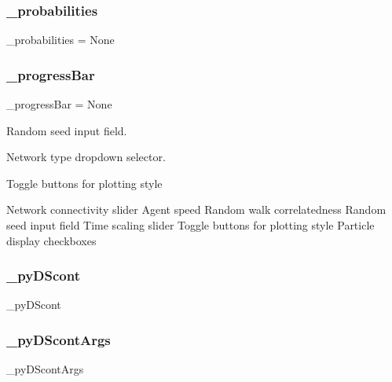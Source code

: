 \subsubsection{\texorpdfstring{\+\_\+probabilities}{\_probabilities}}
{\footnotesize\ttfamily \+\_\+probabilities = None\hspace{0.3cm}{\ttfamily [private]}}

\mbox{\label{namespace_mu_mo_t_a018864aa22d2adb0d3958fb0adbce8e2}} 
\subsubsection{\texorpdfstring{\+\_\+progress\+Bar}{\_progressBar}}
{\footnotesize\ttfamily \+\_\+progress\+Bar = None\hspace{0.3cm}{\ttfamily [private]}}



Random seed input field. 

Network type dropdown selector.

Toggle buttons for plotting style

Network connectivity slider Agent speed Random walk correlatedness Random seed input field Time scaling slider Toggle buttons for plotting style Particle display checkboxes \mbox{\label{namespace_mu_mo_t_a797e92fe19ce2636a49bf1400a69fc49}} 
\subsubsection{\texorpdfstring{\+\_\+py\+D\+Scont}{\_pyDScont}}
{\footnotesize\ttfamily \+\_\+py\+D\+Scont\hspace{0.3cm}{\ttfamily [private]}}

\mbox{\label{namespace_mu_mo_t_aa56e2cffc879be68fdec55f29334415c}} 
\subsubsection{\texorpdfstring{\+\_\+py\+D\+Scont\+Args}{\_pyDScontArgs}}
{\footnotesize\ttfamily \+\_\+py\+D\+Scont\+Args\hspace{0.3cm}{\ttfamily [private]}}


